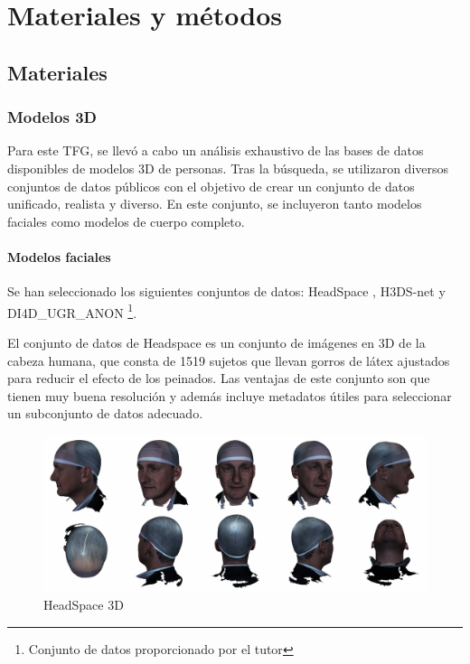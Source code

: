 \chapter{Materiales y métodos}
\thispagestyle{empty}

\section{Materiales}

\subsection{Modelos 3D}

Para este TFG, se llevó a cabo un análisis exhaustivo de las bases de datos disponibles de modelos 3D de personas. Tras la búsqueda, se utilizaron diversos conjuntos de datos públicos con el objetivo de crear un conjunto de datos unificado, realista y diverso. En este conjunto, se incluyeron tanto modelos faciales como modelos de cuerpo completo.

\subsubsection{Modelos faciales}
Se han seleccionado los siguientes conjuntos de datos: HeadSpace \cite{60}, H3DS-net \cite{61} y DI4D\_UGR\_ANON \footnote{Conjunto de datos proporcionado por el tutor}.

El conjunto de datos de Headspace \cite{60} es un conjunto de imágenes en 3D de la cabeza humana, que consta de 1519 sujetos que llevan gorros de látex ajustados para reducir el efecto de los peinados. Las ventajas de este conjunto son que tienen muy buena resolución y además incluye metadatos útiles para seleccionar un subconjunto de datos adecuado.

\begin{figure}[h]
	\centering
	\includegraphics[scale=0.35]{imagenes/cap4/headspace.png}
	\caption{HeadSpace 3D}
	\label{fig1}
\end{figure}

